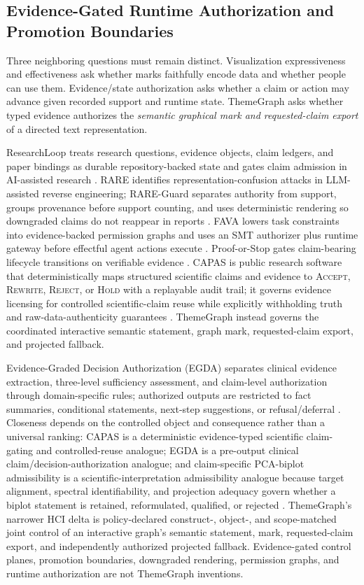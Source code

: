 \documentclass[manuscript,screen,review]{acmart}
\begin{document}
\subsection{Evidence-Gated Runtime Authorization and Promotion Boundaries}

Three neighboring questions must remain distinct. Visualization expressiveness and effectiveness ask whether marks faithfully encode data and whether people can use them. Evidence/state authorization asks whether a claim or action may advance given recorded support and runtime state. ThemeGraph asks whether typed evidence authorizes the \emph{semantic graphical mark and requested-claim export} of a directed text representation.

ResearchLoop treats research questions, evidence objects, claim ledgers, and paper bindings as durable repository-backed state and gates claim admission in AI-assisted research \cite{researchloop2026}. RARE identifies representation-confusion attacks in LLM-assisted reverse engineering; RARE-Guard separates authority from support, groups provenance before support counting, and uses deterministic rendering so downgraded claims do not reappear in reports \cite{rare2026}. FAVA lowers task constraints into evidence-backed permission graphs and uses an SMT authorizer plus runtime gateway before effectful agent actions execute \cite{fava2026}. Proof-or-Stop gates claim-bearing lifecycle transitions on verifiable evidence \cite{prooforstop2026}. CAPAS is public research software that deterministically maps structured scientific claims and evidence to \textsc{Accept}, \textsc{Rewrite}, \textsc{Reject}, or \textsc{Hold} with a replayable audit trail; it governs evidence licensing for controlled scientific-claim reuse while explicitly withholding truth and raw-data-authenticity guarantees \cite{capas2026}. ThemeGraph instead governs the coordinated interactive semantic statement, graph mark, requested-claim export, and projected fallback.

Evidence-Graded Decision Authorization (EGDA) separates clinical evidence extraction, three-level sufficiency assessment, and claim-level authorization through domain-specific rules; authorized outputs are restricted to fact summaries, conditional statements, next-step suggestions, or refusal/deferral \cite{lin2026egda}. Closeness depends on the controlled object and consequence rather than a universal ranking: CAPAS is a deterministic evidence-typed scientific claim-gating and controlled-reuse analogue; EGDA is a pre-output clinical claim/decision-authorization analogue; and claim-specific PCA-biplot admissibility is a scientific-interpretation admissibility analogue because target alignment, spectral identifiability, and projection adequacy govern whether a biplot statement is retained, reformulated, qualified, or rejected \cite{pinto2026}. ThemeGraph's narrower HCI delta is policy-declared construct-, object-, and scope-matched joint control of an interactive graph's semantic statement, mark, requested-claim export, and independently authorized projected fallback. Evidence-gated control planes, promotion boundaries, downgraded rendering, permission graphs, and runtime authorization are not ThemeGraph inventions.
\end{document}
